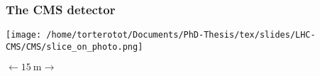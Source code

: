 \begin{frame}\addtocounter{framenumber}{-1}
\frametitle{The CMS detector}
\begin{center}
\vphantom{detects muons going through}

\vfill

\texttt{[image: /home/torterotot/Documents/PhD-Thesis/tex/slides/LHC-CMS/CMS/slice\_on\_photo.png]}

\vfill

$\longleftarrow \SI{15}{\meter} \longrightarrow$
\end{center}
\end{frame}
